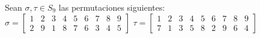 \question
Sean $\sigma,\tau \in S_9$ las permutaciones siguientes:\\
$\sigma = \begin{bmatrix} 1 & 2 & 3 & 4 & 5 & 6 & 7 & 8 & 9 \\
                          2 & 9 & 1 & 8 & 7 & 6 & 3 & 4 & 5
                          \end{bmatrix}$                
$ \tau = \begin{bmatrix} 1 & 2 & 3 & 4 & 5 & 6 & 7 & 8 & 9 \\
                         7 & 1 & 3 & 5 & 8 & 2 & 9 & 6 & 4
                         \end{bmatrix}$ \\
